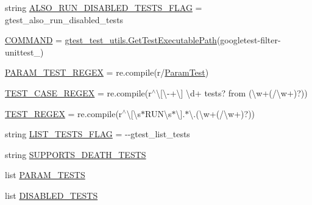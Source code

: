 \begin{DoxyCompactItemize}
\item 
string \mbox{\hyperlink{namespacegoogletest-filter-unittest_abf498ba8de8ed89f11e552d89108a79f}{A\+L\+S\+O\+\_\+\+R\+U\+N\+\_\+\+D\+I\+S\+A\+B\+L\+E\+D\+\_\+\+T\+E\+S\+T\+S\+\_\+\+F\+L\+AG}} = \textquotesingle{}gtest\+\_\+also\+\_\+run\+\_\+disabled\+\_\+tests\textquotesingle{}
\item 
\mbox{\hyperlink{namespacegoogletest-filter-unittest_a0d1ea907e2ca14e1335cbf270df41bac}{C\+O\+M\+M\+A\+ND}} = \mbox{\hyperlink{namespacegtest__test__utils_a89ed3717984a80ffbb7a9c92f71b86a2}{gtest\+\_\+test\+\_\+utils.\+Get\+Test\+Executable\+Path}}(\textquotesingle{}googletest-\/filter-\/unittest\+\_\+\textquotesingle{})
\item 
\mbox{\hyperlink{namespacegoogletest-filter-unittest_af77bfd6536a2e3193efc40a697c0d973}{P\+A\+R\+A\+M\+\_\+\+T\+E\+S\+T\+\_\+\+R\+E\+G\+EX}} = re.\+compile(r\textquotesingle{}/\mbox{\hyperlink{classParamTest}{Param\+Test}}\textquotesingle{})
\item 
\mbox{\hyperlink{namespacegoogletest-filter-unittest_a7a56afb8dd8204a811746ffe2ae508cb}{T\+E\+S\+T\+\_\+\+C\+A\+S\+E\+\_\+\+R\+E\+G\+EX}} = re.\+compile(r\textquotesingle{}$^\wedge$\textbackslash{}\mbox{[}\textbackslash{}-\/+\textbackslash{}\mbox{]} \textbackslash{}d+ tests? from (\textbackslash{}w+(/\textbackslash{}w+)?)\textquotesingle{})
\item 
\mbox{\hyperlink{namespacegoogletest-filter-unittest_aa92cd55f293bfe9c69a9cfcd12f2486d}{T\+E\+S\+T\+\_\+\+R\+E\+G\+EX}} = re.\+compile(r\textquotesingle{}$^\wedge$\textbackslash{}\mbox{[}\textbackslash{}s$\ast$R\+U\+N\textbackslash{}s$\ast$\textbackslash{}\mbox{]}.$\ast$\textbackslash{}.(\textbackslash{}w+(/\textbackslash{}w+)?)\textquotesingle{})
\item 
string \mbox{\hyperlink{namespacegoogletest-filter-unittest_a74c619e65e9f5ff467438c37936138d1}{L\+I\+S\+T\+\_\+\+T\+E\+S\+T\+S\+\_\+\+F\+L\+AG}} = \textquotesingle{}-\/-\/gtest\+\_\+list\+\_\+tests\textquotesingle{}
\item 
string \mbox{\hyperlink{namespacegoogletest-filter-unittest_a5aaa3e6381c05a68e780b8050e524644}{S\+U\+P\+P\+O\+R\+T\+S\+\_\+\+D\+E\+A\+T\+H\+\_\+\+T\+E\+S\+TS}}
\item 
list \mbox{\hyperlink{namespacegoogletest-filter-unittest_a4680842a08f38e6579ce5f1246c23063}{P\+A\+R\+A\+M\+\_\+\+T\+E\+S\+TS}}
\item 
list \mbox{\hyperlink{namespacegoogletest-filter-unittest_a3984439b9efcce4230d56a9f91b2c16d}{D\+I\+S\+A\+B\+L\+E\+D\+\_\+\+T\+E\+S\+TS}}

\end{DoxyCompactItemize}
